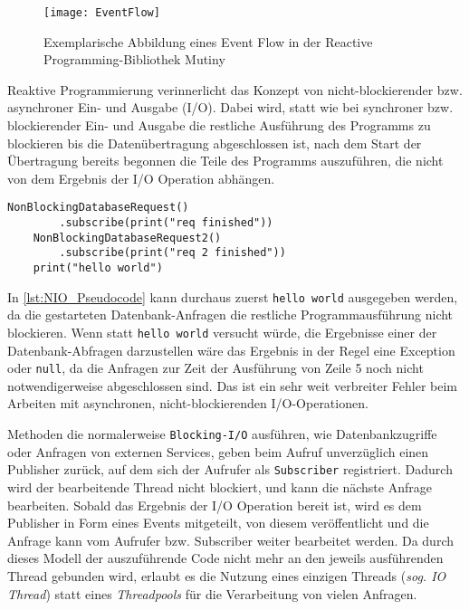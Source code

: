 \begin{figure}[h!]
	\centering
	\texttt{[image: EventFlow]}
	\caption{Exemplarische Abbildung eines Event Flow in der Reactive Programming-Bibliothek Mutiny \parencite{MutinyEventFlow}}
	\label{fig:eventflow_mutiny}
\end{figure}

Reaktive Programmierung verinnerlicht das Konzept von nicht-blockierender bzw. asynchroner Ein- und Ausgabe (I/O).
Dabei wird, statt wie bei synchroner bzw. blockierender Ein- und Ausgabe die restliche Ausführung des Programms
zu blockieren bis die Datenübertragung abgeschlossen ist, nach dem Start der Übertragung bereits begonnen die Teile des
Programms auszuführen, die nicht von dem Ergebnis der I/O Operation abhängen.

\begin{lstlisting}[caption=Pseudocode Nonblocking I/O (NIO), captionpos=b, label=lst:NIO_Pseudocode]
	NonBlockingDatabaseRequest()
		.subscribe(print("req finished"))
	NonBlockingDatabaseRequest2()
		.subscribe(print("req 2 finished"))
	print("hello world")
\end{lstlisting}
In \ref{lst:NIO_Pseudocode} kann durchaus zuerst \verb|hello world| ausgegeben werden, da die gestarteten Datenbank-Anfragen die
restliche Programmausführung nicht blockieren. Wenn statt \verb|hello world| versucht würde, die Ergebnisse einer der Datenbank-Abfragen
darzustellen wäre das Ergebnis in der Regel eine Exception oder \verb|null|, da die Anfragen zur Zeit der Ausführung von Zeile 5 noch nicht notwendigerweise
abgeschlossen sind. Das ist ein sehr weit verbreiter Fehler beim Arbeiten mit asynchronen, nicht-blockierenden I/O-Operationen.

Methoden die normalerweise \verb|Blocking-I/O| ausführen, wie Datenbankzugriffe oder Anfragen von externen Services,
geben beim Aufruf unverzüglich einen Publisher zurück, auf dem sich der Aufrufer als \verb|Subscriber| registriert.
Dadurch wird der bearbeitende Thread nicht blockiert, und kann die nächste Anfrage bearbeiten.
Sobald das Ergebnis der I/O Operation bereit ist, wird es dem Publisher in Form eines Events mitgeteilt, von diesem veröffentlicht und die Anfrage kann
vom Aufrufer bzw. Subscriber weiter bearbeitet werden.
Da durch dieses Modell der auszuführende Code nicht mehr an den jeweils ausführenden Thread gebunden wird, erlaubt es die Nutzung eines einzigen
Threads (\textit{sog. IO Thread}) statt eines \textit{Threadpools} für die Verarbeitung von vielen Anfragen.

